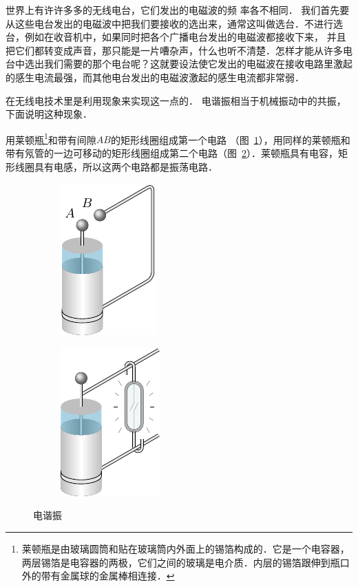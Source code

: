 世界上有许许多多的无线电台，它们发出的电磁波的频
率各不相同．
我们首先要从这些电台发出的电磁波中把我们要接收的选出来，通常这叫做选台．不进行选台，例如在收音机中，如果同时把各个广播电台发出的电磁波都接收下来，
并且把它们都转变成声音，那只能是一片嘈杂声，什么也听不清楚．怎样才能从许多电台中选出我们需要的那个电台呢？这就要设法使它发出的电磁波在接收电路里激起的感生电流最强，而其他电台发出的电磁波激起的感生电流都非常弱．

在无线电技术里是利用现象来实现这一点的．
电谐振相当于机械振动中的共振，下面说明这种现象．

用莱顿瓶\footnote{莱顿瓶是由玻璃圆筒和贴在玻璃筒内外面上的锡箔构成的．它是一个电容器，两层锡箔是电容器的两极，它们之间的玻璃是电介质．内层的锡箔跟伸到瓶口外的带有金属球的金属棒相连接．}和带有间隙$AB$的矩形线圈组成第一个电路
（图~\ref{fig_C_4-16a}），用同样的莱顿瓶和带有氖管的一边可移动的矩形线圈组成第二个电路（图~\ref{fig_C_4-16b}）．莱顿瓶具有电容，矩形线圈具有电感，所以这两个电路都是振荡电路．
\begin{figure}[htbp]
    \centering
    \begin{subfigure}{0.4\linewidth}
        \centering
        \includegraphics{fig/C/4-16a.pdf}
        \caption{}\label{fig_C_4-16a}
    \end{subfigure}
    \hfil
    \begin{subfigure}{0.4\linewidth}
        \centering
        \includegraphics{fig/C/4-16b.pdf}
        \caption{}\label{fig_C_4-16b}
    \end{subfigure}
    \caption{电谐振}\label{fig_C_4-16}
\end{figure}

